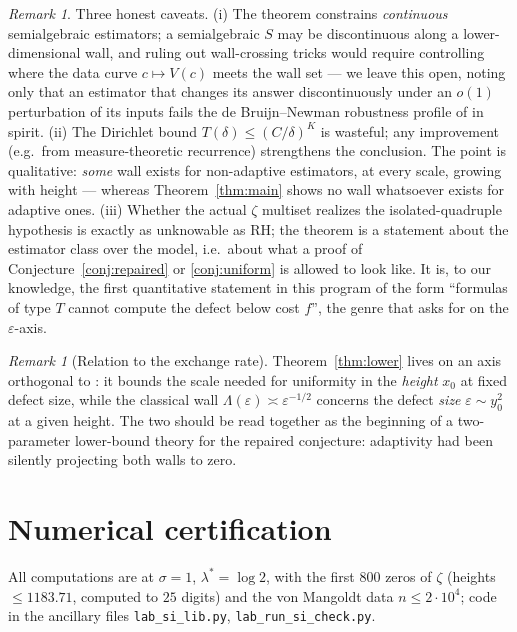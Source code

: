 \documentclass[11pt]{amsart}
\theoremstyle{definition}
\theoremstyle{remark}
\newtheorem{remark}[theorem]{Remark}
\begin{document}
\begin{remark}\label{rem:lowerhonest}
Three honest caveats. (i) The theorem constrains \emph{continuous} semialgebraic estimators; a semialgebraic $S$ may be discontinuous along a lower-dimensional wall, and ruling out wall-crossing tricks would require controlling where the data curve $c\mapsto V(c)$ meets the wall set --- we leave this open, noting only that an estimator that changes its answer discontinuously under an $o(1)$ perturbation of its inputs fails the de Bruijn--Newman robustness profile of \cite[\S2]{SI} in spirit. (ii) The Dirichlet bound $T(\delta)\le(C/\delta)^K$ is wasteful; any improvement (e.g.\ from measure-theoretic recurrence) strengthens the conclusion. The point is qualitative: \emph{some} wall exists for non-adaptive estimators, at every scale, growing with height --- whereas Theorem~\ref{thm:main} shows no wall whatsoever exists for adaptive ones. (iii) Whether the actual $\zeta$ multiset realizes the isolated-quadruple hypothesis is exactly as unknowable as RH; the theorem is a statement about the estimator class over the model, i.e.\ about what a proof of Conjecture~\ref{conj:repaired} or \ref{conj:uniform} is allowed to look like. It is, to our knowledge, the first quantitative statement in this program of the form ``formulas of type $T$ cannot compute the defect below cost $f$'', the genre that \cite[Question~6.2]{SI} asks for on the $\varepsilon$-axis.
\end{remark}

\begin{remark}[Relation to the exchange rate]
Theorem~\ref{thm:lower} lives on an axis orthogonal to \cite[Question~6.2]{SI}: it bounds the scale needed for uniformity in the \emph{height} $x_0$ at fixed defect size, while the classical wall $\Lambda(\varepsilon)\asymp\varepsilon^{-1/2}$ concerns the defect \emph{size} $\varepsilon\sim y_0^2$ at a given height. The two should be read together as the beginning of a two-parameter lower-bound theory for the repaired conjecture: adaptivity had been silently projecting both walls to zero.
\end{remark}

\section{Numerical certification}\label{sec:numerics}

All computations are at $\sigma=1$, $\lambda^*=\log2$, with the first $800$ zeros of $\zeta$ (heights $\le1183.71$, computed to $25$ digits) and the von Mangoldt data $n\le2\cdot10^4$; code in the ancillary files \texttt{lab\_si\_lib.py}, \texttt{lab\_run\_si\_check.py}.
\end{document}
